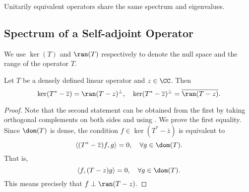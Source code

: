 \documentclass[oneside,reqno,letterpaper]{amsart}
\begin{document}
\begin{proposition}
  \label{thm:spectrum-of-unitarily-equivalent-operators}
  Unitarily equivalent operators share the same spectrum and eigenvalues.
\end{proposition}



\subsection{Spectrum of a Self-adjoint Operator}
We use \(\ker(T)\) and \(\ran(T)\) respectively to denote the null space and the range of the operator \(T\). 
\begin{proposition}
\label{thm:nullspace-and-range-of-adjoint}
  Let \(T\) be a densely defined linear operator and \(z \in \CC\). Then
  \[
    \ker(T^* - \overline{z}) = \ran(T - z)^\perp, \quad \ker(T^* - \overline{z})^\perp = \overline{\ran(T - z)} . 
  \] 
\end{proposition}
\begin{proof}
  Note that the second statement can be obtained from the first by taking orthogonal complements on both sides and using . 
  We prove the first equality. 
  Since \(\dom(T)\) is dense, the condition \(f \in \ker(T^* - \overline{z})\) is equivalent to 
  \[
    \left< (T^* -  \overline{z})f, g \right> = 0, \quad \forall g \in \dom(T) . 
  \]
  That is, 
  \[
    \left< f, (T - z) g \right> = 0, \quad \forall g \in \dom(T) . 
  \] 
  This means precisely that \(f \perp \ran(T - z)\). 
\end{proof}
\end{document}

